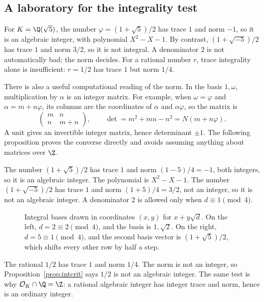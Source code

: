 \subsection*{A laboratory for the integrality test}
For $K=\Q(\sqrt5)$, the number $\varphi=(1+\sqrt5)/2$ has trace $1$ and norm
$-1$, so it is an algebraic integer, with polynomial $X^2-X-1$.
By contrast, $(1+\sqrt{-5})/2$ has trace $1$ and norm $3/2$, so it is not
integral. A denominator $2$ is not automatically bad; the norm decides.
For a rational number $r$, trace integrality alone is insufficient:
$r=1/2$ has trace $1$ but norm $1/4$.

There is also a useful computational reading of the norm. In the basis
$1,\omega$, multiplication by $\alpha$ is an integer matrix. For example, when
$\omega=\varphi$ and $\alpha=m+n\varphi$, its columns are the coordinates of
$\alpha$ and $\alpha\varphi$, so the matrix is
\[
\begin{pmatrix}m&n\\ n&m+n\end{pmatrix},\qquad
\det=m^2+mn-n^2=N(m+n\varphi).
\]
A unit gives an invertible integer matrix, hence determinant $\pm1$.
The following proposition proves the converse directly and avoids assuming
anything about matrices over $\Z$.

\begin{examplex}
The number $(1+\sqrt 5)/2$ has trace $1$ and norm $(1-5)/4=-1$, both integers, so it is an algebraic integer. The polynomial is $X^2-X-1$. The number $(1+\sqrt{-5})/2$ has trace $1$ and norm $(1+5)/4=3/2$, not an integer, so it is not an algebraic integer. A denominator $2$ is allowed only when $d\equiv 1\pmod 4$.
\end{examplex}

\begin{figure}[ht]
\centering
{}
\caption{Integral bases drawn in coordinates $(x,y)$ for $x+y\sqrt d$. On the left, $d=2\equiv 2\pmod 4$, and the basis is $1,\sqrt 2$. On the right, $d=5\equiv 1\pmod 4$, and the second basis vector is $(1+\sqrt 5)/2$, which shifts every other row by half a step.}
\label{fig:t1-bases}
\end{figure}

\begin{examplex}
The rational $1/2$ has trace $1$ and norm $1/4$. The norm is not an integer, so Proposition~\ref{prop:intcrit} says $1/2$ is not an algebraic integer. The same test is why $\mathcal O_K\cap\Q=\Z$: a rational algebraic integer has integer trace and norm, hence is an ordinary integer.
\end{examplex}

